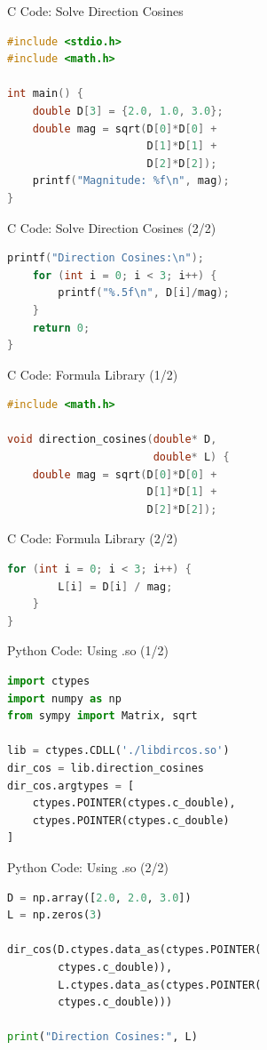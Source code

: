 \documentclass{beamer}
\begin{document}
\begin{frame}[fragile]{C Code: Solve Direction Cosines}
\begin{lstlisting}[language=C]
#include <stdio.h>
#include <math.h>

int main() {
    double D[3] = {2.0, 1.0, 3.0};
    double mag = sqrt(D[0]*D[0] +
                      D[1]*D[1] +
                      D[2]*D[2]);
    printf("Magnitude: %f\n", mag);
}
\end{lstlisting}
\end{frame}

\begin{frame}[fragile]{C Code: Solve Direction Cosines (2/2)}
\begin{lstlisting}[language=C]
    printf("Direction Cosines:\n");
    for (int i = 0; i < 3; i++) {
        printf("%.5f\n", D[i]/mag);
    }
    return 0;
}
\end{lstlisting}
\end{frame}

\begin{frame}[fragile]{C Code: Formula Library (1/2)}
\begin{lstlisting}[language=C]
#include <math.h>

void direction_cosines(double* D,
                       double* L) {
    double mag = sqrt(D[0]*D[0] +
                      D[1]*D[1] +
                      D[2]*D[2]);
\end{lstlisting}
\end{frame}

\begin{frame}[fragile]{C Code: Formula Library (2/2)}
\begin{lstlisting}[language=C]
    for (int i = 0; i < 3; i++) {
        L[i] = D[i] / mag;
    }
}
\end{lstlisting}
\end{frame}

\begin{frame}[fragile]{Python Code: Using .so (1/2)}
\begin{lstlisting}[language=Python]
import ctypes
import numpy as np
from sympy import Matrix, sqrt

lib = ctypes.CDLL('./libdircos.so')
dir_cos = lib.direction_cosines
dir_cos.argtypes = [
    ctypes.POINTER(ctypes.c_double),
    ctypes.POINTER(ctypes.c_double)
]
\end{lstlisting}
\end{frame}

\begin{frame}[fragile]{Python Code: Using .so (2/2)}
\begin{lstlisting}[language=Python]
D = np.array([2.0, 2.0, 3.0])
L = np.zeros(3)

dir_cos(D.ctypes.data_as(ctypes.POINTER(
        ctypes.c_double)),
        L.ctypes.data_as(ctypes.POINTER(
        ctypes.c_double)))

print("Direction Cosines:", L)
\end{lstlisting}
\end{frame}
\end{document}
